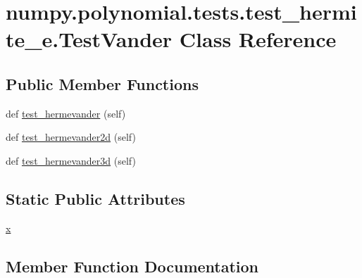 \hypertarget{classnumpy_1_1polynomial_1_1tests_1_1test__hermite__e_1_1TestVander}{}\section{numpy.\+polynomial.\+tests.\+test\+\_\+hermite\+\_\+e.\+Test\+Vander Class Reference}
\label{classnumpy_1_1polynomial_1_1tests_1_1test__hermite__e_1_1TestVander}
\subsection*{Public Member Functions}
\begin{DoxyCompactItemize}
\item 
def \hyperlink{classnumpy_1_1polynomial_1_1tests_1_1test__hermite__e_1_1TestVander_aff07ab338b8b3dac44de7a9d7718075d}{test\+\_\+hermevander} (self)
\item 
def \hyperlink{classnumpy_1_1polynomial_1_1tests_1_1test__hermite__e_1_1TestVander_a7bfa18936172e6c42d79ce4f7cebd43a}{test\+\_\+hermevander2d} (self)
\item 
def \hyperlink{classnumpy_1_1polynomial_1_1tests_1_1test__hermite__e_1_1TestVander_a51417dd665185b32ceeda43800d2ca4f}{test\+\_\+hermevander3d} (self)
\end{DoxyCompactItemize}
\subsection*{Static Public Attributes}
\begin{DoxyCompactItemize}
\item 
\hyperlink{classnumpy_1_1polynomial_1_1tests_1_1test__hermite__e_1_1TestVander_ab7f8e49d7d178ce292949a5db658ef69}{x}
\end{DoxyCompactItemize}


\subsection{Member Function Documentation}
\mbox{\label{classnumpy_1_1polynomial_1_1tests_1_1test__hermite__e_1_1TestVander_aff07ab338b8b3dac44de7a9d7718075d}} 
